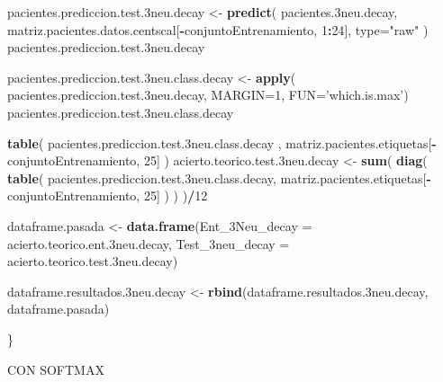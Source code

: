 \documentclass[]{article}
\newenvironment{Shaded}{\begin{snugshade}}{\end{snugshade}}
\newcommand{\KeywordTok}[1]{\textcolor[rgb]{0.13,0.29,0.53}{\textbf{#1}}}
\newcommand{\DataTypeTok}[1]{\textcolor[rgb]{0.13,0.29,0.53}{#1}}
\newcommand{\DecValTok}[1]{\textcolor[rgb]{0.00,0.00,0.81}{#1}}
\newcommand{\StringTok}[1]{\textcolor[rgb]{0.31,0.60,0.02}{#1}}
\newcommand{\OperatorTok}[1]{\textcolor[rgb]{0.81,0.36,0.00}{\textbf{#1}}}
\newcommand{\NormalTok}[1]{#1}
\begin{document}
\begin{Shaded}
\begin{Highlighting}[]
\NormalTok{  pacientes.prediccion.test.3neu.decay <-}\StringTok{ }\KeywordTok{predict}\NormalTok{( pacientes.3neu.decay, matriz.pacientes.datos.centscal[}\OperatorTok{-}\NormalTok{conjuntoEntrenamiento, }\DecValTok{1}\OperatorTok{:}\DecValTok{24}\NormalTok{], }\DataTypeTok{type=}\StringTok{"raw"}\NormalTok{ )}
\NormalTok{  pacientes.prediccion.test.3neu.decay}
  
\NormalTok{  pacientes.prediccion.test.3neu.class.decay <-}\StringTok{ }\KeywordTok{apply}\NormalTok{( pacientes.prediccion.test.3neu.decay, }\DataTypeTok{MARGIN=}\DecValTok{1}\NormalTok{, }\DataTypeTok{FUN=}\StringTok{'which.is.max'}\NormalTok{)}
\NormalTok{  pacientes.prediccion.test.3neu.class.decay}
  
  \KeywordTok{table}\NormalTok{( pacientes.prediccion.test.3neu.class.decay , matriz.pacientes.etiquetas[}\OperatorTok{-}\NormalTok{conjuntoEntrenamiento, }\DecValTok{25}\NormalTok{] )}
\NormalTok{  acierto.teorico.test.3neu.decay <-}\StringTok{ }\KeywordTok{sum}\NormalTok{( }\KeywordTok{diag}\NormalTok{( }\KeywordTok{table}\NormalTok{( pacientes.prediccion.test.3neu.class.decay, matriz.pacientes.etiquetas[}\OperatorTok{-}\NormalTok{conjuntoEntrenamiento, }\DecValTok{25}\NormalTok{] ) ) )}\OperatorTok{/}\DecValTok{12}
  
  
\NormalTok{  dataframe.pasada <-}\StringTok{ }\KeywordTok{data.frame}\NormalTok{(}\DataTypeTok{Ent_3Neu_decay =}\NormalTok{ acierto.teorico.ent.3neu.decay,}
                                 \DataTypeTok{Test_3neu_decay =}\NormalTok{ acierto.teorico.test.3neu.decay)}
  
\NormalTok{  dataframe.resultados.3neu.decay <-}\StringTok{ }\KeywordTok{rbind}\NormalTok{(dataframe.resultados.3neu.decay, dataframe.pasada)}
  
\NormalTok{\}}
\end{Highlighting}
\end{Shaded}

CON SOFTMAX
\end{document}
